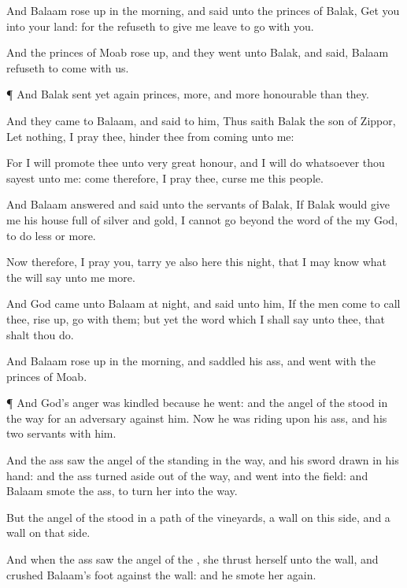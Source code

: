 {And
Balaam rose
up in the
morning, and
said unto the
princes of
Balak,
Get you into your
land: for the
{}
refuseth to give me
leave to
go with you.

And the
princes of
Moab rose
up, and they
went unto
Balak, and
said,
Balaam
refuseth to
come with us.


\par }{\PP {}¶ And
Balak
sent yet
again
princes,
more, and more
honourable than they.

And they
came to
Balaam, and
said to him, Thus
saith
Balak the
son of
Zippor, Let nothing, I pray thee,
hinder thee from
coming unto me:

For I will
promote thee unto
very
great
honour, and I will
do whatsoever thou
sayest unto me:
come therefore, I pray thee,
curse me this
people.

And
Balaam
answered and
said unto the
servants of
Balak, If
Balak would
give me his
house
full of
silver and
gold, I
cannot go
beyond the
word of the
{} my
God, to
do
less or
more.

Now therefore, I pray you,
tarry ye also here this
night, that I may
know what the
{} will
say unto me
more.

And
God
came unto
Balaam at
night, and
said unto him, If the
men
come to
call thee, rise
up,
{}
go with them; but
yet the
word which I shall
say unto thee, that shalt thou
do.

And
Balaam rose
up in the
morning, and
saddled his
ass, and
went with the
princes of
Moab.


\par }{\PP {}¶ And
God’s
anger was
kindled because he
went: and the
angel of the
{}
stood in the
way for an
adversary against him. Now he was
riding upon his
ass, and his
two
servants
{} with him.

And the
ass
saw the
angel of the
{}
standing in the
way, and his
sword
drawn in his
hand: and the
ass turned
aside out of the
way, and
went into the
field: and
Balaam
smote the
ass, to
turn her into the
way.

But the
angel of the
{}
stood in a
path of the
vineyards, a
wall
{} on this side, and a
wall on that side.

And when the
ass
saw the
angel of the
{}, she
thrust herself unto the
wall, and
crushed
Balaam’s
foot against the
wall: and he
smote her
again.

}
